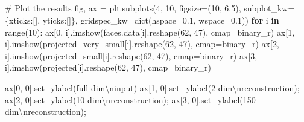 \documentclass[
  letterpaper,
  DIV=11,
  numbers=noendperiod,
  oneside]{scrartcl}
\newenvironment{Shaded}{\begin{snugshade}}{\end{snugshade}}
\newcommand{\BuiltInTok}[1]{\textcolor[rgb]{0.00,0.23,0.31}{#1}}
\newcommand{\CharTok}[1]{\textcolor[rgb]{0.13,0.47,0.30}{#1}}
\newcommand{\CommentTok}[1]{\textcolor[rgb]{0.37,0.37,0.37}{#1}}
\newcommand{\ControlFlowTok}[1]{\textcolor[rgb]{0.00,0.23,0.31}{\textbf{#1}}}
\newcommand{\DecValTok}[1]{\textcolor[rgb]{0.68,0.00,0.00}{#1}}
\newcommand{\FloatTok}[1]{\textcolor[rgb]{0.68,0.00,0.00}{#1}}
\newcommand{\KeywordTok}[1]{\textcolor[rgb]{0.00,0.23,0.31}{\textbf{#1}}}
\newcommand{\NormalTok}[1]{\textcolor[rgb]{0.00,0.23,0.31}{#1}}
\newcommand{\OperatorTok}[1]{\textcolor[rgb]{0.37,0.37,0.37}{#1}}
\newcommand{\StringTok}[1]{\textcolor[rgb]{0.13,0.47,0.30}{#1}}
\begin{document}
\subsection{\texorpdfstring{\emph{}}{}}\label{section-7}

\begin{Shaded}
\begin{Highlighting}[]
\CommentTok{\# Plot the results}
\NormalTok{fig, ax }\OperatorTok{=}\NormalTok{ plt.subplots(}\DecValTok{4}\NormalTok{, }\DecValTok{10}\NormalTok{, figsize}\OperatorTok{=}\NormalTok{(}\DecValTok{10}\NormalTok{, }\FloatTok{6.5}\NormalTok{),}
\NormalTok{                       subplot\_kw}\OperatorTok{=}\NormalTok{\{}\StringTok{\textquotesingle{}xticks\textquotesingle{}}\NormalTok{:[], }\StringTok{\textquotesingle{}yticks\textquotesingle{}}\NormalTok{:[]\},}
\NormalTok{                       gridspec\_kw}\OperatorTok{=}\BuiltInTok{dict}\NormalTok{(hspace}\OperatorTok{=}\FloatTok{0.1}\NormalTok{, wspace}\OperatorTok{=}\FloatTok{0.1}\NormalTok{))}
\ControlFlowTok{for}\NormalTok{ i }\KeywordTok{in} \BuiltInTok{range}\NormalTok{(}\DecValTok{10}\NormalTok{):}
\NormalTok{    ax[}\DecValTok{0}\NormalTok{, i].imshow(faces.data[i].reshape(}\DecValTok{62}\NormalTok{, }\DecValTok{47}\NormalTok{), cmap}\OperatorTok{=}\StringTok{\textquotesingle{}binary\_r\textquotesingle{}}\NormalTok{)}
\NormalTok{    ax[}\DecValTok{1}\NormalTok{, i].imshow(projected\_very\_small[i].reshape(}\DecValTok{62}\NormalTok{, }\DecValTok{47}\NormalTok{), cmap}\OperatorTok{=}\StringTok{\textquotesingle{}binary\_r\textquotesingle{}}\NormalTok{)}
\NormalTok{    ax[}\DecValTok{2}\NormalTok{, i].imshow(projected\_small[i].reshape(}\DecValTok{62}\NormalTok{, }\DecValTok{47}\NormalTok{), cmap}\OperatorTok{=}\StringTok{\textquotesingle{}binary\_r\textquotesingle{}}\NormalTok{)}
\NormalTok{    ax[}\DecValTok{3}\NormalTok{, i].imshow(projected[i].reshape(}\DecValTok{62}\NormalTok{, }\DecValTok{47}\NormalTok{), cmap}\OperatorTok{=}\StringTok{\textquotesingle{}binary\_r\textquotesingle{}}\NormalTok{)}
    
\NormalTok{ax[}\DecValTok{0}\NormalTok{, }\DecValTok{0}\NormalTok{].set\_ylabel(}\StringTok{\textquotesingle{}full{-}dim}\CharTok{\textbackslash{}n}\StringTok{input\textquotesingle{}}\NormalTok{)}
\NormalTok{ax[}\DecValTok{1}\NormalTok{, }\DecValTok{0}\NormalTok{].set\_ylabel(}\StringTok{\textquotesingle{}2{-}dim}\CharTok{\textbackslash{}n}\StringTok{reconstruction\textquotesingle{}}\NormalTok{)}\OperatorTok{;}
\NormalTok{ax[}\DecValTok{2}\NormalTok{, }\DecValTok{0}\NormalTok{].set\_ylabel(}\StringTok{\textquotesingle{}10{-}dim}\CharTok{\textbackslash{}n}\StringTok{reconstruction\textquotesingle{}}\NormalTok{)}\OperatorTok{;}
\NormalTok{ax[}\DecValTok{3}\NormalTok{, }\DecValTok{0}\NormalTok{].set\_ylabel(}\StringTok{\textquotesingle{}150{-}dim}\CharTok{\textbackslash{}n}\StringTok{reconstruction\textquotesingle{}}\NormalTok{)}\OperatorTok{;}
\end{Highlighting}
\end{Shaded}
\end{document}
